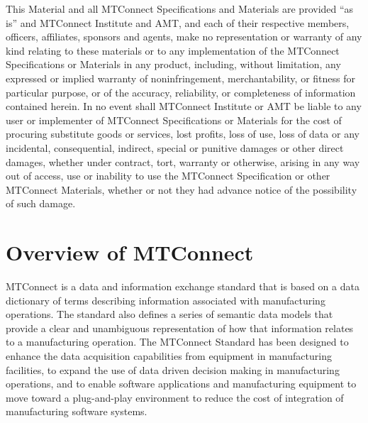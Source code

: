 \documentclass{mtconnect}	%
\begin{document}
\begin{nolinenumbers}
This Material and all MTConnect Specifications and Materials are provided ``as is'' and MTConnect Institute and AMT, and each of their respective members, officers, affiliates, sponsors and agents, make no representation or warranty of any kind relating to these materials or to any implementation of the MTConnect Specifications or Materials in any product, including, without limitation, any expressed or implied warranty of noninfringement, merchantability, or fitness for particular purpose, or of the accuracy, reliability, or completeness of information contained herein. In no event shall MTConnect Institute or AMT be liable to any user or implementer of MTConnect Specifications or Materials for the cost of procuring substitute goods or services, lost profits, loss of use, loss of data or any incidental, consequential, indirect, special or punitive damages or other direct damages, whether under contract, tort, warranty or otherwise, arising in any way out of access, use or inability to use the MTConnect Specification or other MTConnect Materials, whether or not they had advance notice of the possibility of such damage.


\clearpage
\tableofcontents
\thispagestyle{fancy}
\clearpage
\listoffigures
\thispagestyle{fancy}
\clearpage
\listoftables
\end{nolinenumbers}



\section{Overview of MTConnect}

MTConnect is a data and information exchange standard that is based on a \gls{data dictionary} of terms describing information associated with manufacturing operations.  The standard also defines a series of \glspl{semantic data model} that provide a clear and unambiguous representation of how that information relates to a manufacturing operation.  The MTConnect Standard has been designed to enhance the data acquisition capabilities from equipment in manufacturing facilities, to expand the use of data driven decision making in manufacturing operations, and to enable software applications and manufacturing equipment to move toward a plug-and-play environment to reduce the cost of integration of manufacturing software systems.
\end{document}
